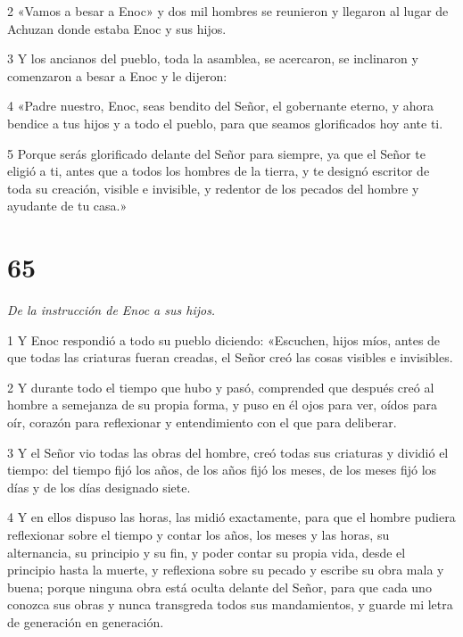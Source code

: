 \par 2 «Vamos a besar a Enoc» y dos mil hombres se reunieron y llegaron al lugar de Achuzan donde estaba Enoc y sus hijos.

\par 3 Y los ancianos del pueblo, toda la asamblea, se acercaron, se inclinaron y comenzaron a besar a Enoc y le dijeron:

\par 4 «Padre nuestro, Enoc, seas bendito del Señor, el gobernante eterno, y ahora bendice a tus hijos y a todo el pueblo, para que seamos glorificados hoy ante ti.

\par 5 Porque serás glorificado delante del Señor para siempre, ya que el Señor te eligió a ti, antes que a todos los hombres de la tierra, y te designó escritor de toda su creación, visible e invisible, y redentor de los pecados del hombre y ayudante de tu casa.»

\chapter{65}

\par \textit{De la instrucción de Enoc a sus hijos.}

\par 1 Y Enoc respondió a todo su pueblo diciendo: «Escuchen, hijos míos, antes de que todas las criaturas fueran creadas, el Señor creó las cosas visibles e invisibles.

\par 2 Y durante todo el tiempo que hubo y pasó, comprended que después creó al hombre a semejanza de su propia forma, y ​​puso en él ojos para ver, oídos para oír, corazón para reflexionar y entendimiento con el que para deliberar.

\par 3 Y el Señor vio todas las obras del hombre, creó todas sus criaturas y dividió el tiempo: del tiempo fijó los años, de los años fijó los meses, de los meses fijó los días y de los días designado siete.

\par 4 Y en ellos dispuso las horas, las midió exactamente, para que el hombre pudiera reflexionar sobre el tiempo y contar los años, los meses y las horas, su alternancia, su principio y su fin, y poder contar su propia vida, desde el principio hasta la muerte, y reflexiona sobre su pecado y escribe su obra mala y buena; porque ninguna obra está oculta delante del Señor, para que cada uno conozca sus obras y nunca transgreda todos sus mandamientos, y guarde mi letra de generación en generación.


